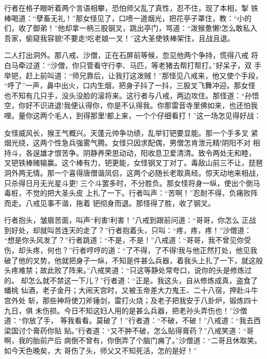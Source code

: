 行者在格子眼听着两个言语相攀，恐怕师父乱了真性，忍不住，现了本相，掣
铁棒喝道：“孽畜无礼！”那女怪见了，口喷一道烟光，把花亭子罩住，教：“小的
们，收了御弟！”他却拿一柄三股钢叉，跳出亭门，骂道：“泼猴惫懒!怎么敢私入
吾家，偷窥我容貌!不要走!吃老娘一叉！”这大圣使铁棒架住，且战且退。

二人打出洞外。那八戒、沙僧，正在石屏前等候，忽见他两个争持，慌得八戒
将白马牵过道：“沙僧，你只管看守行李、马匹，等老猪去帮打帮打。”好呆子，双
手举钯，赶上前叫道：“师兄靠后，让我打这泼贼！”那怪见八戒来，他又使个手段，
“呼了”一声，鼻中出火，口内生烟，把身子抖了一抖，三股叉飞舞冲迎。那女怪
也不知有几只手，没头没脸的滚将来。这行者与八戒，两边攻住。那怪道：“孙悟
空，你好不识进退!我便认得你，你是不认得我。你那雷音寺里佛如来，也还怕我
哩。量你这两个毛人，到得那里!都上来，一个个仔细看打！”这一场怎见得好战：

女怪威风长，猴王气概兴。天蓬元帅争功绩，乱举钉钯要显能。那一个手多叉
紧烟光绕，这两个性急兵强雾气腾。女怪只因求配偶，男僧怎肯泄元精!阴阳不对
相持斗，各逞雄才恨苦争。阴静养荣思动动，阳收息卫爱清清。致令两处无和睦，
叉钯铁棒赌输赢。这个棒有力，钯更能，女怪钢叉丁对丁。毒敌山前三不让，琵琶
洞外两无情。那一个喜得唐僧谐凤侣，这两个必随长老取真经。惊天动地来相战，
只杀得日月无光星斗更!
三个斗罢多时，不分胜负。那女怪将身一纵，使出个倒马毒桩，不觉的把大圣头皮
上扎了一下。行者叫声：“苦啊！”忍耐不得，负痛败阵而走。八戒见事不谐，拖着
钯彻身而退。那怪得了胜，收了钢叉。

行者抱头，皱眉苦面，叫声“利害!利害！”八戒到跟前问道：“哥哥，你怎么
正战到好处，却就叫苦连天的走了？”行者抱着头，只叫：“疼，疼，疼！”沙僧道：
“想是你头风发了？”行者跳道：“不是，不是！”八戒道：“哥哥，我不曾见你受
伤，却头疼，何也？”行者哼哼的道：“了不得，了不得!我与他正然打处，他见我
破了他的叉势，他就把身子一纵，不知是件甚么兵器，着我头上扎了一下，就这般
头疼难禁；故此败了阵来。”八戒笑道：“只这等静处常夸口，说你的头是修炼过的。
却怎么就不禁这一下儿？”行者道：“正是。我这头，自从修炼成真，盗食了蟠桃
仙酒，老子金丹；大闹天宫时，又被玉帝差大力鬼王、二十八宿，押赴斗牛宫外处
斩，那些神将使刀斧锤剑，雷打火烧；及老子把我安于八卦炉，锻炼四十九日，俱
未伤损。今日不知这妇人用的是甚么兵器，把老孙头弄伤也！”沙僧道：“你放了手，
等我看看。莫破了！”行者道：“不破，不破！”八戒道：“我去西梁国讨个膏药你贴
贴。”行者道：“又不肿不破，怎么贴得膏药？”八戒笑道：“哥啊，我的胎前产后
病倒不曾有，你倒弄了个脑门痈了。”沙僧道：“二哥且休取笑。如今天色晚矣，大
哥伤了头，师父又不知死活，怎的是好！”

